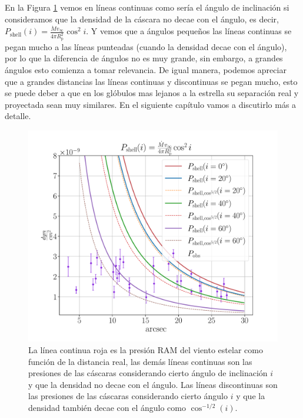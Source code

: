 \documentclass{book}
\begin{document}
En la Figura \ref{fig:ncos_2} vemos en líneas continuas como sería el ángulo de inclinación si consideramos que la densidad de la cáscara no decae con el ángulo, es decir, $P_\mathrm{shell}(i)=\frac{\dot{M}v_\infty}{4\pi R_\mathrm{p}^2}\cos^2i$. Y vemos que a ángulos pequeños las líneas continuas se pegan mucho a las líneas punteadas (cuando la densidad decae con el ángulo), por lo que la diferencia de ángulos no es muy grande, sin embargo, a grandes ángulos esto comienza a tomar relevancia. De igual manera, podemos apreciar que a grandes distancias las líneas continuas y discontinuas se pegan mucho, esto se puede deber a que en los glóbulos mas lejanos a la estrella su separación real y proyectada sean muy similares. En el siguiente capítulo vamos a discutirlo más a detalle.

\begin{figure}[htb]
    \centering
    \includegraphics[width=\textwidth]{imagenes_corregidas/S_2.pdf}
    \caption{La línea continua roja es la presión RAM del viento estelar como función de la distancia real, las demás líneas continuas son las presiones de las cáscaras considerando cierto ángulo de inclinación $i$ y que la densidad no decae con el ángulo. Las líneas discontinuas son las presiones de las cáscaras considerando cierto ángulo $i$ y que la densidad también decae con el ángulo como $\cos^{-1/2}(i)$.}
    \label{fig:ncos_2}
\end{figure}
\end{document}
